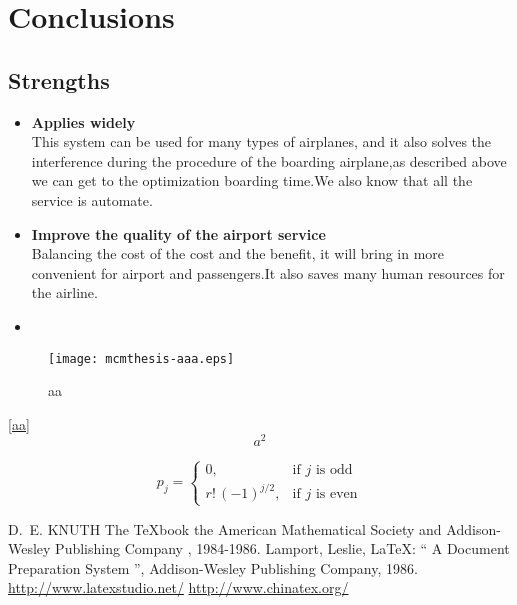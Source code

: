 \documentclass{mcmthesis}
\begin{document}
\section{Conclusions}
\subsection{Strengths}
\begin{itemize}
  \item \textbf{Applies widely}\\
        This  system can be used for many types of airplanes, and it also
        solves the interference during  the procedure of the boarding
        airplane,as described above we can get to the  optimization
        boarding time.We also know that all the service is automate.
  \item \textbf{Improve the quality of the airport service}\\
        Balancing the cost of the cost and the benefit, it will bring in
        more convenient  for airport and passengers.It also saves many
        human resources for the airline. \item \textbf{}
\end{itemize}

\begin{figure}[h]
  \small
  \centering
  \texttt{[image: mcmthesis-aaa.eps]}
  \caption{aa} \label{fig:aa}
\end{figure}

\lipsum[8] \eqref{aa}
\begin{equation}
  a^2 \label{aa}
\end{equation}


\[
  p_{j}=\begin{cases} 0,              & \text{if $j$ is odd}  \\
    r!\,(-1)^{j/2}, & \text{if $j$ is even}
  \end{cases}
\]

\begin{thebibliography}{99}
   D.~E. KNUTH   The \TeX{}book  the American
  Mathematical Society and Addison-Wesley
  Publishing Company , 1984-1986.
  Lamport, Leslie,  \LaTeX{}: `` A Document Preparation System '',
  Addison-Wesley Publishing Company, 1986.
  \url{http://www.latexstudio.net/}
  \url{http://www.chinatex.org/}
\end{thebibliography}
\end{document}
